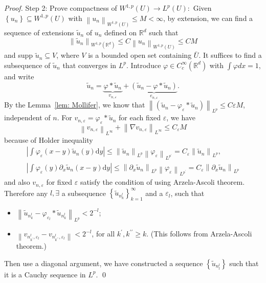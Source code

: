 \begin{proof}
\noindent Step 2:  Prove compactness of $W^{1, p}(U) \rightarrow L^{p}(U):$ Given $\left\{u_{n}\right\} \subseteq W^{1, p}(U)$ with $\left\|u_{n}\right\|_{W^{1, p}(U)} \leq M<\infty$, by extension, we can find a sequence of extensions $\widetilde{u}_{n}$ of $u_{n}$ defined on $\mathbb{R}^{d}$ such that
$$
\left\|\widetilde{u}_{n}\right\|_{W^{1, p}\left(\mathbb{R}^{d}\right)} \leq C\left\|u_{n}\right\|_{W^{1,p}(U)} \leq C M
$$
and supp $\widetilde{u}_{n} \subseteq V$, where $V$ is a bounded open set containing $\bar{U}$. It suffices to find a subsequence of $\widetilde{u}_{n}$ that converges in $L^{p}$. Introduce $\varphi \in C_{c}^{\infty}\left(\mathbb{R}^{d}\right)$ with $\int \varphi d x=1$, and write
$$
\tilde{u}_{n}=\underbrace{\varphi * \widetilde{u}_{n}}_{v_{n, \varepsilon}}+\underbrace{\left(\widetilde{u}_{n}-\varphi * \widetilde{u}_{n}\right)}_{e_{n, \varepsilon}} .
$$
By the Lemma~\ref{lem: Mollifer}, we know that $\left\|\left(\widetilde{u}_{n}-\varphi_{\varepsilon} * \widetilde{u}_{n}\right)\right\|_{L^{p}} \leq C \varepsilon M$, independent of $n$. For $v_{n, \varepsilon}=\varphi_{\varepsilon} * \widetilde{u}_{n}$ for each fixed $\varepsilon$, we have
$$
\left\|v_{n, \varepsilon}\right\|_{L^{\infty}}+\left\|\nabla v_{n, \varepsilon}\right\|_{L^{\infty}} \leq C_{\varepsilon} M
$$
because of Holder inequality
\begin{align*}
    \left|\int \varphi_{\varepsilon}(x-y) \widetilde{u}_{n}(y) \mathrm{d} y\right| \leq\left\|\widetilde{u}_{n}\right\|_{L^{p}}\left\|\varphi_{\varepsilon}\right\|_{L^{p^{\prime}}}=C_{\varepsilon}\left\|\widetilde{u}_{n}\right\|_{L^{p}},\\ 
    \left|\int \varphi_{\varepsilon}(y) \partial_x\widetilde{u}_{n}(x-y) \mathrm{d} y\right| \leq\left\|\partial_x\widetilde{u}_{n}\right\|_{L^{p}}\left\|\varphi_{\varepsilon}\right\|_{L^{p^{\prime}}}=C_{\varepsilon}\left\|\partial_x\widetilde{u}_{n}\right\|_{L^{p}}
\end{align*}
and also $v_{n, \varepsilon}$ for fixed $\varepsilon$ satisfy the condition of using Arzela-Ascoli theorem.
Therefore any $l, \exists$ a subsequence $\left\{\widetilde{u}_{n_{k}^{l}}\right\}_{k=1}^{\infty}$ and a $\varepsilon_{l}$, such that

\begin{itemize}
    \item $\left\|\widetilde{u}_{n_{k}^{l}}-\varphi_{\varepsilon_{l}} * \widetilde{u}_{n_{k}^{l}}\right\|_{L^{p}}<2^{-l}$;
    \item $\left\|v_{n_{k^{\prime}}^{l}, \varepsilon_{l}}-v_{n_{k^{\prime \prime}}^{l}, \varepsilon_{l}}\right\|<2^{-l}$, for all $k^{\prime}, k^{\prime \prime} \geq k$. (This follows from Arzela-Ascoli theorem.)
\end{itemize}
Then use a diagonal argument, we have constructed a sequence $\left\{\widetilde{u}_{n_{l}^{l}}\right\}$ such that it is a Cauchy sequence in $L^{p}$.
\qed
\end{proof}

